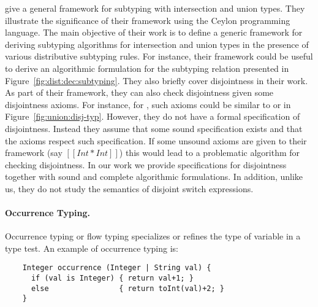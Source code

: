 \cite{muehlboeck2018empowering} give a general framework for subtyping
with intersection and union types. They illustrate the significance of
their framework using the Ceylon programming language.
The main objective of their work is to define a generic framework for
deriving subtyping algorithms for
intersection and union types in the presence of various distributive subtyping rules.
For instance, their framework could be useful to derive an algorithmic
formulation for the subtyping relation presented in Figure~\ref{fig:dist:dec:subtyping}.
They also briefly cover disjointness in their work. As part of their framework, they
can also check disjointness given some disjointness axioms. For instance,
for \name, such axioms could be similar to  or 
in Figure~\ref{fig:union:disj-typ}.
However, they do not have a formal
specification of disjointness. Instead they assume that some sound specification
exists and that the axioms respect such specification.
If some unsound axioms are given to their framework (say $[[Int * Int]]$) this
would lead to a problematic algorithm for checking disjointness.
In our work we provide specifications for disjointness together
with sound and complete algorithmic formulations.
In addition, unlike us,
they do not study the semantics of disjoint switch expressions.

\paragraph*{Occurrence Typing.}
Occurrence typing or flow typing \citep{tobin2008design} specializes or refines
the type of variable in a type test. An example of occurrence typing is:

\begin{lstlisting}
	Integer occurrence (Integer | String val) {
	  if (val is Integer) { return val+1; }
	  else                { return toInt(val)+2; }
	}
\end{lstlisting}

